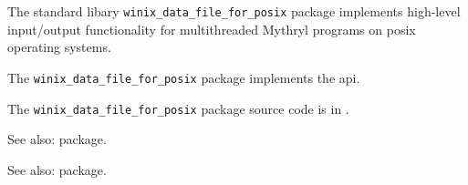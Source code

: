 
The standard libary {\tt winix\_data\_file\_for\_posix} package implements high-level input/output functionality for multithreaded Mythryl programs on posix operating systems.

The {\tt winix\_data\_file\_for\_posix} package implements the  api.

The {\tt winix\_data\_file\_for\_posix} package source code is in .

See also:  package.

See also:  package.


